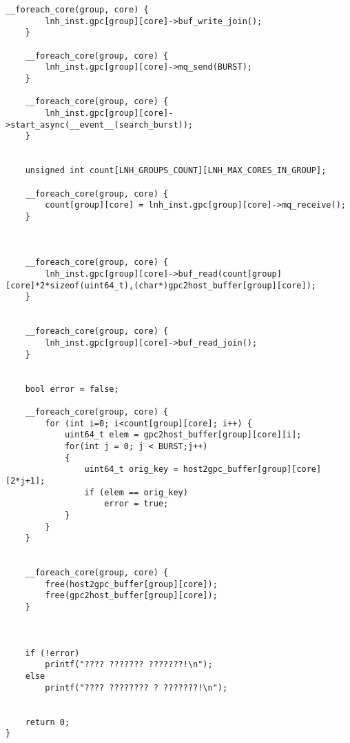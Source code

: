 \begin{lstlisting}[caption={Код программы по индивидуальному варианту host\_main.cpp}, label=lst1, style=Go]
	__foreach_core(group, core) {
		lnh_inst.gpc[group][core]->buf_write_join();
	}

	__foreach_core(group, core) {
		lnh_inst.gpc[group][core]->mq_send(BURST);
	}

	__foreach_core(group, core) {
		lnh_inst.gpc[group][core]->start_async(__event__(search_burst));
	}


	unsigned int count[LNH_GROUPS_COUNT][LNH_MAX_CORES_IN_GROUP];

	__foreach_core(group, core) {
		count[group][core] = lnh_inst.gpc[group][core]->mq_receive();
	}



	__foreach_core(group, core) {
		lnh_inst.gpc[group][core]->buf_read(count[group][core]*2*sizeof(uint64_t),(char*)gpc2host_buffer[group][core]);
	}


	__foreach_core(group, core) {
		lnh_inst.gpc[group][core]->buf_read_join();
	}


	bool error = false;

	__foreach_core(group, core) {
		for (int i=0; i<count[group][core]; i++) {
			uint64_t elem = gpc2host_buffer[group][core][i];
            for(int j = 0; j < BURST;j++)
            {
                uint64_t orig_key = host2gpc_buffer[group][core][2*j+1];
                if (elem == orig_key)
                    error = true;
            }
		}
	}


	__foreach_core(group, core) {
		free(host2gpc_buffer[group][core]);
		free(gpc2host_buffer[group][core]);
	}
	
	

	if (!error)
		printf("???? ??????? ???????!\n");
	else
		printf("???? ???????? ? ???????!\n");


	return 0;
}
\end{lstlisting}
